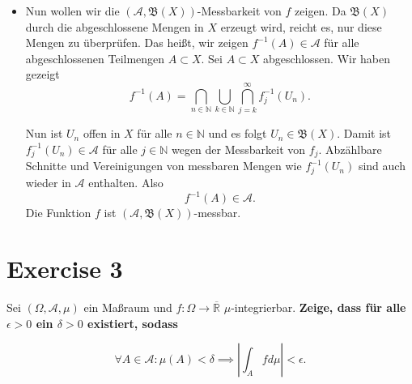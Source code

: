 \documentclass{article}
\begin{document}
\begin{itemize}
    \item Nun wollen wir die $(\mathcal A, \mathfrak B(X))$-Messbarkeit von $f$ zeigen. Da $\mathfrak B(X)$ durch die abgeschlossene Mengen in $X$ erzeugt wird, reicht es, nur diese Mengen zu überprüfen. Das heißt, wir zeigen $f^{-1}(A) \in \mathcal A$ für alle abgeschlossenen Teilmengen $A \subset X$. Sei $A \subset X$ abgeschlossen. Wir haben gezeigt
    $$
        f^{-1}(A) = \bigcap_{n \in \mathbb N} \bigcup_{k \in \mathbb N} \bigcap_{j=k}^\infty f_j^{-1}(U_n).
    $$

    Nun ist $U_n$ offen in $X$ für alle $n \in \mathbb N$ und es folgt $U_n \in \mathfrak B(X)$. Damit ist $f_j^{-1}(U_n) \in \mathcal A$ für alle $j \in \mathbb N$ wegen der Messbarkeit von $f_j$. Abzählbare Schnitte und Vereinigungen von messbaren Mengen wie $f_j^{-1}(U_n)$ sind auch wieder in $\mathcal A$ enthalten. Also 
    $$
        f^{-1}(A) \in \mathcal A.
    $$
    Die Funktion $f$ ist $(\mathcal A, \mathfrak B(X))$-messbar.
\end{itemize}




\section*{Exercise 3}

Sei $(\Omega, \mathcal A, \mu)$ ein Maßraum und $f: \Omega \to \overline{\mathbb R}$ $\mu$-integrierbar. \textbf{Zeige, dass für alle $\epsilon > 0$ ein $\delta > 0$ existiert, sodass}

$$
    \forall A \in \mathcal A: \mu(A) < \delta \implies \left|\int_A f d\mu\right| < \epsilon.
$$
\end{document}
